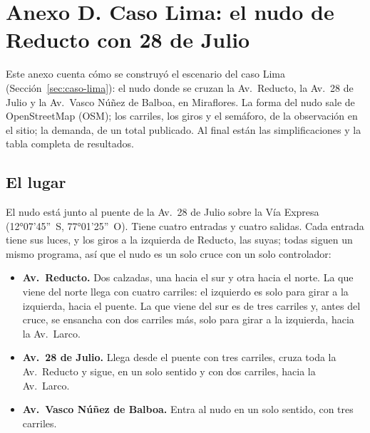 \section*{Anexo D. Caso Lima: el nudo de Reducto con 28 de Julio}
{}
\setcounter{figure}{0}
\renewcommand{\thefigure}{D.\arabic{figure}}
\renewcommand{\theHfigure}{D.\arabic{figure}}
\setcounter{table}{0}
\renewcommand{\thetable}{D.\arabic{table}}
\renewcommand{\theHtable}{D.\arabic{table}}

Este anexo cuenta cómo se construyó el escenario del caso Lima
(Sección~\ref{sec:caso-lima}): el nudo donde se cruzan la Av.~Reducto,
la Av.~28 de Julio y la Av.~Vasco Núñez de Balboa, en Miraflores. La
forma del nudo sale de OpenStreetMap (OSM); los carriles, los giros y el
semáforo, de la observación en el sitio; la demanda, de un total
publicado. Al final están las simplificaciones y la tabla completa de
resultados.

\subsection*{El lugar}

El nudo está junto al puente de la Av.~28 de Julio sobre la Vía Expresa
(12°07'45''~S, 77°01'25''~O). Tiene cuatro entradas y cuatro salidas.
Cada entrada tiene sus luces, y los giros a la izquierda de Reducto, las
suyas; todas siguen un mismo programa, así que el nudo es un solo cruce
con un solo controlador:
\begin{itemize}
  \item \textbf{Av.~Reducto.} Dos calzadas, una hacia el sur y otra
    hacia el norte. La que viene del norte llega con cuatro carriles: el
    izquierdo es solo para girar a la izquierda, hacia el puente. La que
    viene del sur es de tres carriles y, antes del cruce, se ensancha
    con dos carriles más, solo para girar a la izquierda, hacia la
    Av.~Larco.
  \item \textbf{Av.~28 de Julio.} Llega desde el puente con tres
    carriles, cruza toda la Av.~Reducto y sigue, en un solo sentido y
    con dos carriles, hacia la Av.~Larco.
  \item \textbf{Av.~Vasco Núñez de Balboa.} Entra al nudo en un solo
    sentido, con tres carriles.
\end{itemize}

